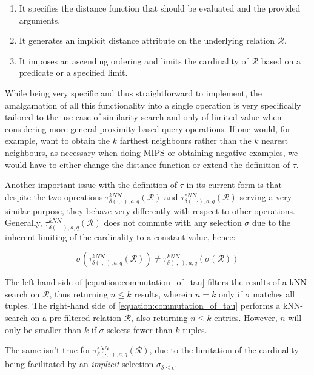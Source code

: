 \begin{enumerate}
    \item It specifies the distance function that should be evaluated and the provided arguments.
    \item It generates an implicit distance attribute on the underlying relation $\mathcal{R}$.
    \item It imposes an ascending ordering and limits the cardinality of $\mathcal{R}$ based on a predicate or a specified limit.
\end{enumerate}

While being very specific and thus straightforward to implement, the amalgamation of all this functionality into a single operation is very specifically tailored to the use-case of similarity search and only of limited value when considering more general proximity-based query operations. If one would, for example, want to obtain the $k$ farthest neighbours rather than the $k$ nearest neighbours, as necessary when doing MIPS or obtaining negative examples, we would have to either change the distance function or extend the definition of $\tau$. 

Another important issue with the definition of $\tau$ in its current form is that despite the two opreations $\tau^{kNN}_{\delta(\cdot,\cdot),a,q}(\mathcal{R})$ and $\tau^{\epsilon NN}_{\delta(\cdot,\cdot),a,q}(\mathcal{R})$ serving a very similar purpose, they behave very differently with respect to other operations. Generally, $\tau^{kNN}_{\delta(\cdot,\cdot),a,q}(\mathcal{R})$ does not commute with any selection $\sigma$ due to the inherent limiting of the cardinality to a constant value, hence:

\begin{equation}
    \label{equation:commutation_of_tau}
    \sigma(\tau^{kNN}_{\delta(\cdot,\cdot),a,q}(\mathcal{R})) \neq \tau^{kNN}_{\delta(\cdot,\cdot),a,q}(\sigma(\mathcal{R}))
\end{equation}

The left-hand side of \cref{equation:commutation_of_tau} filters the results of a kNN-search on $\mathcal{R}$, thus returning $n \leq k$ results, wherein $n = k$ only if $\sigma$ matches all tuples. The right-hand side of \cref{equation:commutation_of_tau} performs a kNN-search on a pre-filtered relation $\mathcal{R}$, also returning $n \leq k$ entries. However, $n$ will only be smaller than $k$ if $\sigma$ selects fewer than $k$ tuples.

The same isn't true for $\tau^{\epsilon NN}_{\delta(\cdot,\cdot),a,q}(\mathcal{R})$, due to the limitation of the cardinality being facilitated by an \emph{implicit} selection $\sigma_{\delta \leq \epsilon}$.

